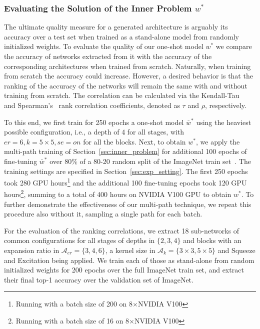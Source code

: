\documentclass[dvipsnames,table,xcdraw]{article}
\begin{document}
\subsubsection{Evaluating the Solution of the Inner Problem $w^*$}\label{sec:evaluate_inner}
The ultimate quality measure for a generated architecture is arguably its accuracy over a test set when trained as a stand-alone model from randomly initialized weights.
To evaluate the quality of our one-shot model $ w^*$ we compare the accuracy of networks extracted from it with the accuracy of the corresponding architectures when trained from scratch. 
Naturally, when training from scratch the accuracy could increase. However, a desired behavior is that the ranking of the accuracy of the networks will remain the same with and without training from scratch.
The correlation can be calculated via the Kendall-Tau~\cite{KendallTau} and Spearman's~\cite{spearman1961general} rank correlation coefficients, denoted as $\tau$ and $\rho$, respectively.

To this end, we first train for 250 epochs a one-shot model $\bar{w}^*$ using the heaviest possible configuration, i.e., a depth of $4$ for all stages, with $er=6, k=5\times 5, se=on$ for all the blocks. Next, to obtain $w^*$, we apply the multi-path training of Section~\ref{sec:inner_problem} for additional 100 epochs of fine-tuning $\bar{w}^*$ over 80\% of a 80-20 random split of the ImageNet train set~\cite{imagenet_cvpr09}. The training settings are specified in Section~\ref{sec:exp_setting}. 
The first 250 epochs took 280 GPU hours\footnote{Running with a batch size of 200 on 8$\times$NVIDIA V100} and the additional 100 fine-tuning epochs took 120 GPU hours\footnote{\label{fn:batch_16}Running with a batch size of 16 on 8$\times$NVIDIA V100}, summing to a total of 400 hours on NVIDIA V100 GPU to obtain $w^*$.
To further demonstrate the effectiveness of our multi-path technique, we repeat this procedure also without it, sampling a single path for each batch.

For the evaluation of the ranking correlations, we extract 18 sub-networks of common configurations for all stages of depths in $\{2,3,4\}$ and blocks with an expansion ratio in $\mathcal{A}_{er}=\{3,4,6\}$, a kernel size in $\mathcal{A}_k=\{3\times 3,5\times 5\}$ and Squeeze and Excitation being applied. 
We train each of those as stand-alone from random initialized weights for 200 epochs over the full ImageNet train set, and extract their final top-1 accuracy over the validation set of ImageNet. 
\end{document}
